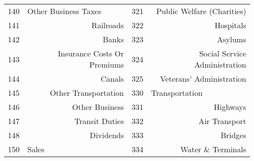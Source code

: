 \begin{tabular}{@{}rr|r|r|@{}}
\multicolumn{1}{|l|}{140}           & \multicolumn{1}{l|}{Other Business Taxes}                          & 321                                & Public Welfare (Charities)                                                         \\
\multicolumn{1}{|r|}{141}           & Railroads                                                          & 322                                & Hospitals                                                                          \\
\multicolumn{1}{|r|}{142}           & Banks                                                              & 323                                & Asylums                                                                            \\
\multicolumn{1}{|r|}{143}           & Insurance Costs Or Premiums                                        & 324                                & Social Service Administration                                                      \\
\multicolumn{1}{|r|}{144}           & Canals                                                             & 325                                & Veterans' Administration                                                           \\
\multicolumn{1}{|r|}{145}           & Other Transportation                                               & \multicolumn{1}{l|}{330}           & \multicolumn{1}{l|}{Transportation}                                                \\
\multicolumn{1}{|r|}{146}           & Other Business                                                     & 331                                & Highways                                                                           \\
\multicolumn{1}{|r|}{147}           & Transit Duties                                                     & 332                                & Air Transport                                                                      \\
\multicolumn{1}{|r|}{148}           & Dividends                                                          & 333                                & Bridges                                                                            \\
\multicolumn{1}{|l|}{150}           & \multicolumn{1}{l|}{Sales}                                         & 334                                & Water \& Terminals                                                                 \\

\end{tabular}
